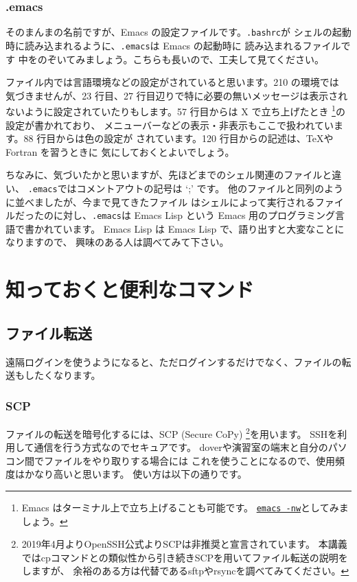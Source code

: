 \documentclass[a4j]{ltjsreport}
\begin{document}
    \subsection{.emacs}
    そのまんまの名前ですが、Emacs の設定ファイルです。\verb+.bashrc+が
    シェルの起動時に読み込まれるように、\verb+.emacs+は Emacs の起動時に
    読み込まれるファイルです
    中をのぞいてみましょう。こちらも長いので、工夫して見てください。

    ファイル内では言語環境などの設定がされていると思います。210 の環境では
    気づきませんが、23 行目、27 行目辺りで特に必要の無いメッセージは表示され
    ないように設定されていたりもします。57 行目からは X で立ち上げたとき
    \footnote{Emacs はターミナル上で立ち上げることも可能です。
    \underline{\texttt{emacs -nw}}としてみましょう。}の設定が書かれており、
    メニューバーなどの表示・非表示もここで扱われています。88 行目からは色の設定が
    されています。120 行目からの記述は、\TeX や Fortran を習うときに
    気にしておくとよいでしょう。

    ちなみに、気づいたかと思いますが、先ほどまでのシェル関連のファイルと違い、
    \verb+.emacs+ではコメントアウトの記号は `;' です。
    他のファイルと同列のように並べましたが、今まで見てきたファイル
    はシェルによって実行されるファイルだったのに対し、\verb+.emacs+は 
    Emacs Lisp という Emacs 用のプログラミング言語で書かれています。
    Emacs Lisp は Emacs Lisp で、語り出すと大変なことになりますので、
    興味のある人は調べてみて下さい。





    \chapter{知っておくと便利なコマンド}
    \section{ファイル転送}
    遠隔ログインを使うようになると、ただログインするだけでなく、ファイルの転送もしたくなります。

    \subsection{SCP}
    ファイルの転送を暗号化するには、SCP (Secure CoPy)
    \footnote{2019年4月よりOpenSSH公式よりSCPは非推奨と宣言されています。
    本講義ではcpコマンドとの類似性から引き続きSCPを用いてファイル転送の説明をしますが、
    余裕のある方は代替であるsftpやrsyncを調べてみてください。}を用います。
    SSHを利用して通信を行う方式なのでセキュアです。
    doverや演習室の端末と自分のパソコン間でファイルをやり取りする場合には
    これを使うことになるので、使用頻度はかなり高いと思います。
    使い方は以下の通りです。
\end{document}
